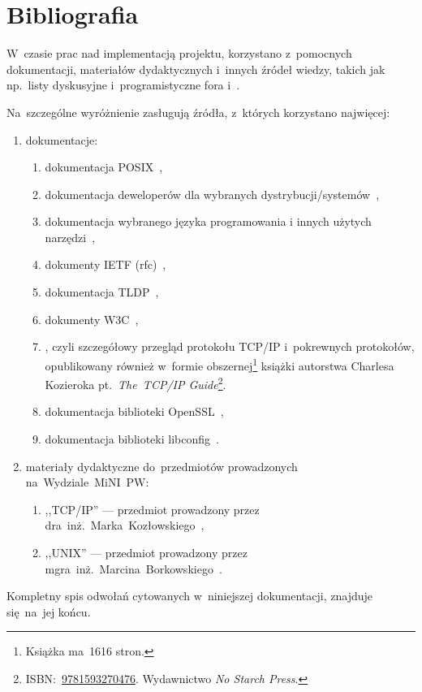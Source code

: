 \documentclass[thesis]{subfiles}
\begin{document}

\section{Bibliografia}

W~czasie prac nad implementacją projektu, korzystano z~pomocnych dokumentacji, materiałów dydaktycznych i~innych źródeł wiedzy, takich jak np.~listy dyskusyjne i~programistyczne fora  i~.

\noindent Na~szczególne wyróżnienie zasługują źródła, z~których korzystano najwięcej:
\begin{enumerate}
	\item dokumentacje:
	\begin{enumerate}
		\item dokumentacja POSIX~\cite{posix},
		\item dokumentacja deweloperów dla wybranych dystrybucji/systemów~\cite{archlinux-wiki,gentoo-wiki},
		\item dokumentacja wybranego języka programowania i innych użytych narzędzi~\cite{glibc-doc},
		\item dokumenty IETF (\gls{rfc})~\cite{rfc-editor},
		\item dokumentacja TLDP~\cite{tldp},
		\item dokumenty W3C~\cite{w3c},
		\item {}, czyli szczegółowy przegląd protokołu TCP/IP i~pokrewnych protokołów, opublikowany również w~formie obszernej\footnote{Książka ma~1616 stron.} książki autorstwa \mbox{Charlesa} \mbox{Kozieroka} pt.~\emph{The~TCP/IP Guide}\footnote{ISBN:~\href{https://www.nostarch.com/tcpip.htm}{9781593270476}. Wydawnictwo \emph{No Starch Press}.}.
		\item dokumentacja biblioteki OpenSSL~\cite{openssl-doc},
		\item dokumentacja biblioteki libconfig~\cite{libconfig-doc}.
	\end{enumerate}
	\item materiały dydaktyczne do~przedmiotów prowadzonych na~Wydziale~MiNI~PW:
	\begin{enumerate}
		\item ,,TCP/IP'' --- przedmiot prowadzony przez dra~inż.~Marka~Kozłowskiego~\cite{kozlowski},
		\item ,,UNIX'' --- przedmiot prowadzony przez mgra~inż.~Marcina~Borkowskiego~\cite{borkowski}.
	\end{enumerate}
\end{enumerate}
Kompletny spis odwołań cytowanych w~niniejszej dokumentacji, znajduje się~na~jej końcu.
\end{document}
